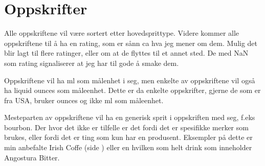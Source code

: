 \section{Oppskrifter}
Alle oppskriftene vil være sortert etter hovedsprittype. Videre kommer alle oppskriftene til å ha en rating, som er sånn ca hva jeg mener om dem. Mulig det blir lagt til flere ratinger, eller om at de flyttes til et annet sted. De med NaN som rating signaliserer at jeg har til gode å smake dem.

Oppskriftene vil ha ml som målenhet i seg, men enkelte av oppskriftene vil også ha liquid ounces som måleenhet. Dette er da enkelte oppskrifter, gjerne de som er fra USA, bruker ounces og ikke ml som måleenhet. 

Mesteparten av oppskriftene vil ha en generisk sprit i oppskriften med seg, f.eks bourbon. Der hvor det ikke er tilfelle er det fordi det er spesifikke merker som brukes, eller fordi det er ting som kun har en produsent. Eksempler på dette er min anbefalte Irish Coffe (side \pageref{drink:irish_coffee}) eller en hvilken som helt drink som inneholder Angostura Bitter. 









